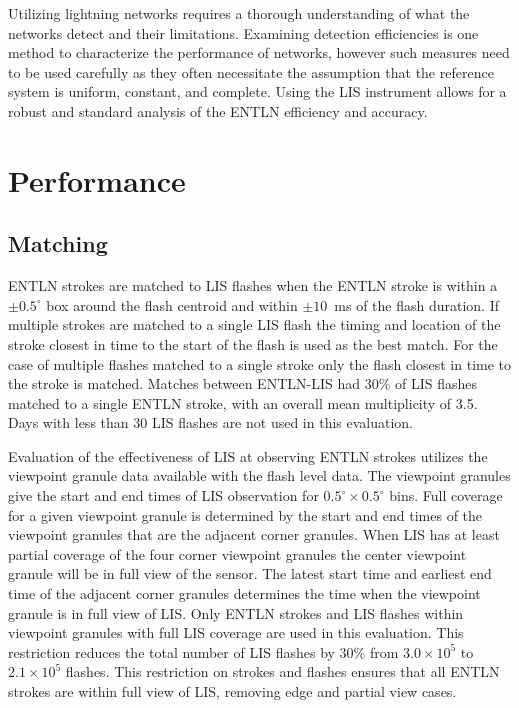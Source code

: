 Utilizing lightning networks requires a thorough understanding of what the networks detect and their limitations.
Examining detection efficiencies is one method to characterize the performance of networks, however such measures need to be used carefully as they often necessitate the assumption that the reference system is uniform, constant, and complete.
Using the LIS instrument allows for a robust and standard analysis of the ENTLN efficiency and accuracy.

\section{Performance}

\subsection{Matching}

ENTLN strokes are matched to LIS flashes when the ENTLN stroke is within a $\pm0.5^\circ$ box around the flash centroid and within $\pm10$~ms of the flash duration.
If multiple strokes are matched to a single LIS flash the timing and location of the stroke closest in time to the start of the flash is used as the best match.
For the case of multiple flashes matched to a single stroke only the flash closest in time to the stroke is matched.
Matches between ENTLN-LIS had 30\% of LIS flashes matched to a single ENTLN stroke, with an overall mean multiplicity of 3.5.
Days with less than 30 LIS flashes are not used in this evaluation.

Evaluation of the effectiveness of LIS at observing ENTLN strokes utilizes the viewpoint granule data available with the flash level data.
The viewpoint granules give the start and end times of LIS observation for $0.5^\circ \times 0.5^\circ$ bins.
Full coverage for a given viewpoint granule is determined by the start and end times of the viewpoint granules that are the adjacent corner granules.
When LIS has at least partial coverage of the four corner viewpoint granules the center viewpoint granule will be in full view of the sensor.
The latest start time and earliest end time of the adjacent corner granules determines the time when the viewpoint granule is in full view of LIS.
Only ENTLN strokes and LIS flashes within viewpoint granules with full LIS coverage are used in this evaluation.
This restriction reduces the total number of LIS flashes by 30\% from $3.0 \times 10^5$ to $2.1 \times 10^5$ flashes.
This restriction on strokes and flashes ensures that all ENTLN strokes are within full view of LIS, removing edge and partial view cases.

